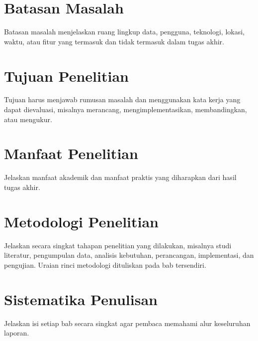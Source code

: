 \section{Batasan Masalah}

Batasan masalah menjelaskan ruang lingkup data, pengguna, teknologi, lokasi, waktu, atau fitur yang termasuk dan tidak termasuk dalam tugas akhir.

\section{Tujuan Penelitian}

Tujuan harus menjawab rumusan masalah dan menggunakan kata kerja yang dapat dievaluasi, misalnya merancang, mengimplementasikan, membandingkan, atau mengukur.

\section{Manfaat Penelitian}

Jelaskan manfaat akademik dan manfaat praktis yang diharapkan dari hasil tugas akhir.

\section{Metodologi Penelitian}

Jelaskan secara singkat tahapan penelitian yang dilakukan, misalnya studi literatur, pengumpulan data, analisis kebutuhan, perancangan, implementasi, dan pengujian. Uraian rinci metodologi dituliskan pada bab tersendiri.

\section{Sistematika Penulisan}

Jelaskan isi setiap bab secara singkat agar pembaca memahami alur keseluruhan laporan.
